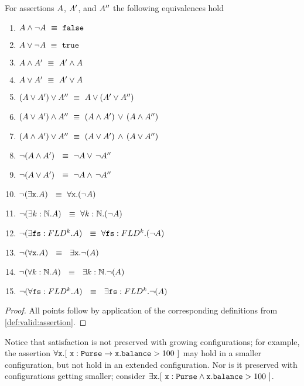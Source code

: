 \begin{lemma}
For     assertions $A$, $A'$, and $A''$ the following equivalences hold
\label{lemma:basic_assertions_classical}
\begin{enumerate}
\item
$ A \wedge\neg A \ \equiv \  {\mbox{\tt{false}}}$
\item
$ A \vee \neg A   \ \equiv \  {\mbox{\tt{true}}}$
\item
$ A \wedge A'  \ \equiv \  A' \wedge A$
\item
$ A \vee A'  \ \equiv \  A' \vee A$
\item
$(A \vee A') \vee A'' \ \equiv \  A \vee (A' \vee A'')$
\item
$(A \vee A') \wedge A'' \ \equiv \  (A \wedge A')\, \vee\, (A \wedge A'')$
\item
$(A \wedge A') \vee A'' \ \equiv \  (A \vee A')\, \wedge\, (A \vee A'')$
\item
$\neg (A \wedge A') \  \ \equiv \  \neg  A   \vee\, \neg A''$
\item
$\neg (A \vee A') \  \ \equiv \  \neg  A   \wedge\, \neg A''$
\item
$\neg (\exists \prg{x}.\A )  \  \ \equiv \  \forall \prg{x}.(\neg  \A)$
\item
$\neg (\exists k:\mathbb{N}.\A )  \  \ \equiv \  \forall  k:\mathbb{N}.(\neg  \A)$
\item
$\neg (\exists {\mbox{\tt{fs}}}:FLD^k.A )  \  \ \equiv \  \forall {\mbox{\tt{fs}}}:FLD^k.(\neg  A)$
\item
$\neg (\forall \prg{x}. \A)  \  \ \equiv \  \  \exists \prg{x}.\neg(\A )$
\item
$\neg (\forall k:\mathbb{N}. \A)  \  \ \equiv \  \  \exists k:\mathbb{N}.\neg(\A )$
\item
$\neg (\forall {\mbox{\tt{fs}}}:FLD^k. A)  \  \ \equiv \  \  \exists {\mbox{\tt{fs}}}:FLD^k.\neg(A )$
\end{enumerate}
\end{lemma}
\begin{proof}
All points follow by application of the corresponding definitions from \ref{def:valid:assertion}.
 \end{proof}

Notice that satisfaction is not preserved with growing configurations; for example, the assertion $\forall {\mbox{\tt{x}}}. [\ {\mbox{\tt{x}}} : {\mbox{\tt{Purse}}} \rightarrow {\mbox{\tt{x}}}.{\mbox{\tt{balance}}}>100\ ]$ may hold in a smaller configuration, but not hold in an extended configuration. Nor is it preserved with configurations getting smaller; consider \eg $\exists {\mbox{\tt{x}}}. [\ {\mbox{\tt{x}}} : {\mbox{\tt{Purse}}} \wedge {\mbox{\tt{x}}}.{\mbox{\tt{balance}}}>100\ ]$.

